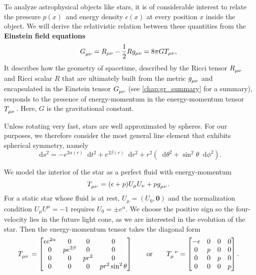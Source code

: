 \documentclass[a4paper,11pt,twoside]{report}
\newcommand\dif{\mathop{}\!\mathrm{d}}
\begin{document}
To analyze astrophysical objects like stars, it is of considerable interest to relate the pressure $p(x)$ and energy density $\epsilon(x)$ at every position $x$ inside the object.
We will derive the relativistic relation between these quantities from the \textbf{Einstein field equations} \cite{ref:carroll}
\begin{equation}
	G\indices{_\mu_\nu} = R_{\mu \nu} - \frac{1}{2} R g_{\mu \nu} = 8 \pi G T_{\mu \nu} ,
	\label{eq:einstein}
\end{equation}
It describes how the geometry of spacetime, described by the Ricci tensor $R\indices{_\mu_\nu}$ and Ricci scalar $R$ that are ultimately built from the metric $g\indices{_\mu_\nu}$ and encapsulated in the Einstein tensor $G\indices{_\mu_\nu}$ (see \cref{chap:gr_summary} for a summary), responds to the presence of energy-momentum in the energy-momentum tensor $T\indices{_\mu_\nu}$.
Here, $G$ is the gravitational constant.

Unless rotating very fast, stars are well approximated by spheres.
For our purposes, we therefore consider the most general line element that exhibits spherical symmetry, namely \cite{ref:tolman}
\begin{equation}
	\dif s^2 = -e^{2 \alpha(r)} \dif t^2 + e^{2 \beta(r)} \dif r^2 + r^2 \left( \dif \theta^2 + \sin^2 \theta \dif \phi^2 \right) .
\end{equation}

We model the interior of the star as a perfect fluid with energy-momentum \cite{ref:carroll}
\begin{equation}
	T\indices{_\mu_\nu} = (\epsilon+p) U_\mu U_\nu + p g\indices{_\mu_\nu}.
\end{equation}
For a static star whose fluid is at rest, $U_\mu = (U_0, \textbf{0})$ and the normalization condition $U_\mu U^\mu = -1$ requires $U_0 = \pm e^\alpha$.
We choose the positive sign so the four-velocity lies in the future light cone, as we are interested in the evolution of the star.
Then the energy-momentum tensor takes the diagonal form
\begin{equation}
T\indices{_\mu_\nu} =
\begin{bmatrix}
	\epsilon e^{2\alpha} & 0            & 0     & 0                   \\
	0                    & p e^{2\beta} & 0     & 0                   \\
	0                    & 0            & p r^2 & 0                   \\
	0                    & 0            & 0     & p r^2 \sin^2 \theta \\
\end{bmatrix}
\qquad \text{or} \qquad
T\indices{_\mu^\nu} =
\begin{bmatrix}
	-\epsilon & 0 & 0 & 0 \\
	0         & p & 0 & 0 \\
	0         & 0 & p & 0 \\
	0         & 0 & 0 & p \\
\end{bmatrix}
.
\label{eq:einstein_to_tov:T}
\end{equation}
\end{document}
